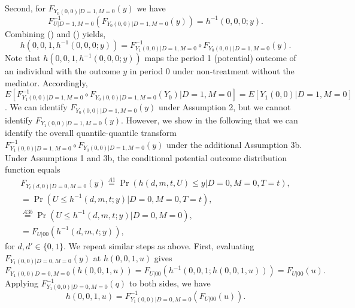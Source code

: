 \documentclass[a4paper,12pt]{article}
\begin{document}
 \doublespacing \pagestyle{plain}
Second, for $F_{Y_0(0,0)|D=1,M=0}(y)$ we have
\begin{equation}
F_{U|D=1,M=0}^{-1} ( F_{Y_0(0,0)|D=1,M=0}(y)) =   h^{-1}(0,0,0;y).
\end{equation}
Combining () and () yields,
\begin{equation} 
h(0,0,1,h^{-1}(0,0,0;y))  =F_{Y_1(0,0)|D=1,M=0}^{-1} \circ F_{Y_0(0,0)|D=1,M=0}(y) .
\end{equation}
Note that $h(0,0,1,h^{-1}(0,0,0;y))$ maps the period 1 (potential) outcome of an individual with the outcome $y$ in period 0 under non-treatment without the mediator. Accordingly, $E[F_{Y_1(0,0)|D=1,M=0}^{-1} \circ F_{Y_0(0,0)|D=1,M=0}(Y_0)|D=1,M=0]= E[Y_1(0,0)|D=1,M=0]$. We can identify $F_{Y_0(0,0)|D=1,M=0}(y)$ under Assumption 2, but we cannot identify $F_{Y_1(0,0)|D=1,M=0}(y)$. However, we show in the following that we can identify the overall quantile-quantile transform $F_{Y_1(0,0)|D=1,M=0}^{-1} \circ F_{Y_0(0,0)|D=1,M=0}(y)$ under the additional Assumption 3b.
Under Assumptions 1 and 3b, the conditional potential outcome distribution function equals
\begin{equation} 
\begin{array}{rl}
 F_{Y_t(d,0)|D=0,M=0}(y)  \stackrel{A1}{=} \Pr(h(d,m,t,U) \leq y|D=0,M=0,T=t) ,\\
= \Pr(U \leq h^{-1}(d,m,t;y)|D=0,M=0,T=t) ,\\
\stackrel{A3b}{=} \Pr(U \leq h^{-1}(d,m,t;y)|D=0,M=0) ,\\
= F_{U|00} ( h^{-1}(d,m,t;y)),
\end{array}
\end{equation}
for $d,d' \in \{0,1\}$. We repeat similar steps as above. First, evaluating $F_{Y_1(0,0)|D=0,M=0}(y)$ at $h(0,0,1,u)$ gives
\begin{equation*}
F_{Y_1(0,0)D=0,M=0}(h(0,0,1,u)) = F_{U|00} ( h^{-1}(0,0,1;h(0,0,1,u)))  =F_{U|00} ( u).
\end{equation*}
Applying $F_{Y_1(0,0)|D=0,M=0}^{-1}(q)$ to both sides, we have
\begin{equation} 
h(0,0,1,u)  =F_{Y_1(0,0)|D=0,M=0}^{-1}(F_{U|00} ( u)).
\end{equation}
\end{document}
